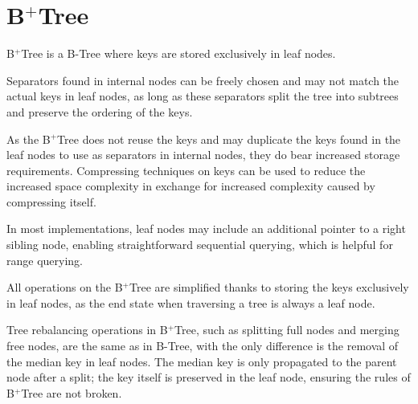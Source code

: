 \section{B$^+$Tree}

\begin{definition}
  B$^+$Tree is a B-Tree where keys are stored exclusively in leaf nodes.
\end{definition}

Separators found in internal nodes can be freely chosen and may not match the actual keys in leaf nodes, as long as these separators split the tree into subtrees and preserve the ordering of the keys.

As the B$^+$Tree does not reuse the keys and may duplicate the keys found in the leaf nodes to use as separators in internal nodes, they do bear increased storage requirements. Compressing techniques on keys can be used to reduce the increased space complexity in exchange for increased complexity caused by compressing itself.

In most implementations, leaf nodes may include an additional pointer to a right sibling node, enabling straightforward sequential querying, which is helpful for range querying.



All operations on the B$^+$Tree are simplified thanks to storing the keys exclusively in leaf nodes, as the end state when traversing a tree is always a leaf node.

Tree rebalancing operations in B$^+$Tree, such as splitting full nodes and merging free nodes, are the same as in B-Tree, with the only difference is the removal of the median key in leaf nodes. The median key is only propagated to the parent node after a split; the key itself is preserved in the leaf node, ensuring the rules of B$^+$Tree are not broken.